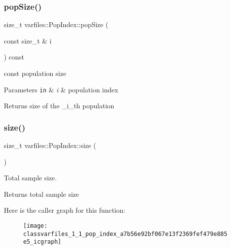 \subsubsection{\texorpdfstring{pop\+Size()}{popSize()}\hspace{0.1cm}{\footnotesize\ttfamily [2/2]}}
{\footnotesize\ttfamily size\+\_\+t varfiles\+::\+Pop\+Index\+::pop\+Size (\begin{DoxyParamCaption}\item[{const size\+\_\+t \&}]{i }\end{DoxyParamCaption}) const\hspace{0.3cm}{\ttfamily [inline]}}



{\ttfamily const} population size 


\begin{DoxyParams}[1]{Parameters}
\mbox{\tt in}  & {\em i} & population index \\
\hline
\end{DoxyParams}
\begin{DoxyReturn}{Returns}
size of the \+\_\+i\+\_\+th population 
\end{DoxyReturn}
\mbox{\label{classvarfiles_1_1_pop_index_a7b56e92bf067e13f2369fef479e885e5}} 
\subsubsection{\texorpdfstring{size()}{size()}\hspace{0.1cm}{\footnotesize\ttfamily [1/2]}}
{\footnotesize\ttfamily size\+\_\+t varfiles\+::\+Pop\+Index\+::size (\begin{DoxyParamCaption}{ }\end{DoxyParamCaption})\hspace{0.3cm}{\ttfamily [inline]}}



Total sample size. 

\begin{DoxyReturn}{Returns}
total sample size 
\end{DoxyReturn}
Here is the caller graph for this function\+:\nopagebreak
\begin{figure}[H]
\begin{center}
\leavevmode
\texttt{[image: classvarfiles\_1\_1\_pop\_index\_a7b56e92bf067e13f2369fef479e885e5\_icgraph]}
\end{center}
\end{figure}
\mbox{\label{classvarfiles_1_1_pop_index_a0ec0d2bb7d598c684896f59a6a06d34c}} 
